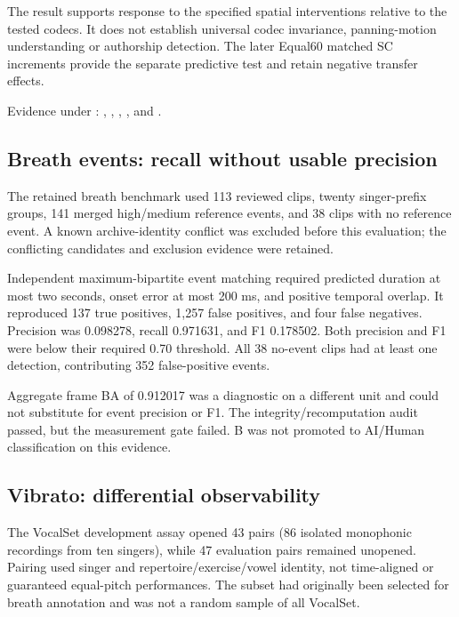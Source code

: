 The result supports response to the specified spatial interventions relative
to the tested codecs. It does not establish universal codec invariance,
panning-motion understanding or authorship detection. The later Equal60
matched SC increments provide the separate predictive test and retain
negative transfer effects.
\begingroup\raggedright
Evidence under :
,
,
,
, and
.\par
\endgroup

\subsection{Breath events: recall without usable precision}

The retained breath benchmark used 113 reviewed clips, twenty singer-prefix
groups, 141 merged high/medium reference events, and 38 clips with no reference
event. A known archive-identity conflict was excluded before this evaluation;
the conflicting candidates and exclusion evidence were retained.

Independent maximum-bipartite event matching required predicted duration at
most two seconds, onset error at most 200 ms, and positive temporal overlap.
It reproduced 137 true positives, 1,257 false positives, and four false
negatives. Precision was 0.098278, recall 0.971631, and F1 0.178502. Both
precision and F1 were below their required 0.70 threshold. All 38 no-event
clips had at least one detection, contributing 352 false-positive events.

Aggregate frame BA of 0.912017 was a diagnostic on a different unit and could
not substitute for event precision or F1. The integrity/recomputation audit
passed, but the measurement gate failed. B was not promoted to AI/Human
classification on this evidence.

\subsection{Vibrato: differential observability}

The VocalSet development assay opened 43 pairs (86 isolated monophonic
recordings from ten singers), while 47 evaluation pairs remained unopened.
Pairing used singer and repertoire/exercise/vowel identity, not time-aligned
or guaranteed equal-pitch performances. The subset had originally been selected
for breath annotation and was not a random sample of all VocalSet.

